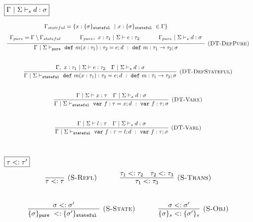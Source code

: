 \documentclass{llncs}
\newcommand{\keywadj}[1]{\mathtt{#1}}
\newcommand{\keyw}[1]{\keywadj{#1}~}
\begin{document}
$\fbox{$\Gamma~|~\Sigma \vdash_s d : \sigma$}$
\[
\begin{array}{c}

\infer[\textsc{(DT-DefPure)}]
  {\Gamma~|~\Sigma \vdash_{\keyw{pure}} \keyw{def} m(x : \tau_1) : \tau_2 = e; d~:~\keyw{def} m : \tau_1 \rightarrow \tau_2; \sigma}
  {\def\arraystretch{1.6}
  \begin{array}{c}
\Gamma_{stateful} = \{x : \{ \sigma \}_{\keyw{stateful}} ~|~ x : \{ \sigma \}_{\keyw{stateful}} \in \Gamma\} \\
\Gamma_{pure} = \Gamma \setminus \Gamma_{stateful}~~~~~~~~~~\Gamma_{pure},~x : \tau_1~|~\Sigma \vdash e : \tau_2~~~~~~~~~~\Gamma_{pure}~|~\Sigma \vdash_s d : \sigma
  \end{array}}\\[5ex]

\infer[\textsc{(DT-DefStateful)}]
  {\Gamma~|~\Sigma \vdash_{\keyw{stateful}} \keyw{def} m(x : \tau_1) : \tau_2 = e; d~:~\keyw{def} m : \tau_1 \rightarrow \tau_2; \sigma}
  {\Gamma,~x : \tau_1~|~\Sigma \vdash e : \tau_2 & \Gamma~|~\Sigma \vdash_s d : \sigma}\\[5ex]

\infer[\textsc{(DT-Varx)}]
  {\Gamma~|~\Sigma \vdash_{\keyw{stateful}} \keyw{var} f : \tau = x; d~:~\keyw{var} f : \tau; \sigma}
  {\Gamma~|~\Sigma \vdash x : \tau & \Gamma~|~\Sigma \vdash_s d : \sigma}\\[5ex]

\infer[\textsc{(DT-Varl)}]
  {\Gamma~|~\Sigma \vdash_{\keyw{stateful}} \keyw{var} f : \tau = l; d~:~\keyw{var} f : \tau; \sigma}
  {\Gamma~|~\Sigma \vdash l : \tau & \Gamma~|~\Sigma \vdash_s d : \sigma}\\[5ex]

\end{array}
\]

$\fbox{$\tau <: \tau'$}$
\[
\begin{array}{c}
\infer[\textsc{(S-Refl)}]
  {\tau <: \tau}
  {}%
~~~~~~~~~~
\infer[\textsc{(S-Trans)}]
  {\tau_1 <: \tau_3}
  {\tau_1 <: \tau_2 & \tau_2 <: \tau_3}\\[5ex]

\infer[\textsc{(S-State)}]
  {\{ \sigma \}_{\keyw{pure}} <: \{ \sigma' \}_{\keyw{stateful}}}
  {\sigma <: \sigma'}%
~~~~~~~~~~
\infer[\textsc{(S-Obj)}]
  {\{ \sigma \}_{s} <: \{ \sigma' \}_{s}}
  {\sigma <: \sigma'}\\[5ex]  

\end{array}
\]
\end{document}
